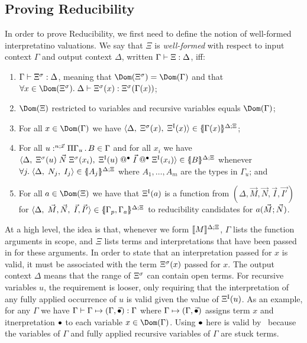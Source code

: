 \documentclass{article}
\begin{document}
\subsection{Proving Reducibility}
\label{subsec:reducibility}

In order to prove Reducibility, we first need to define the notion of
well-formed interpretatino valuations.
We say that $\Xi$ is \emph{well-formed} with respect to input
context $\Gamma$ and output context $\Delta$,
written $\ivtypej{\Xi}{\Delta}$, iff:
\begin{enumerate}
\item $\typej{\Dsubst[\Xi]}{\Delta}$, meaning that
  $\Dom(\Dsubst[\Xi])=\Dom(\Gamma)$ and that
  $\forall x\in\Dom(\Dsubst[\Xi]).\;\typej[\Delta]{\Dsubst[\Xi](x)}{\Dsubst[\Xi](\Gamma(x))}$;

\item $\Dom(\Xi)$ restricted to variables and recursive variables
  equals $\Dom(\Gamma)$;

\item For all $x\in\Dom(\Gamma)$ we have
  $\triple{\Delta}{\Dsubst[\Xi](x)}{\Dlookup{x}}\in\interpd{\Gamma(x)}$;

\item For all $\guform{n}{\vec{x}}{\pigamma{\Gamma_u}{B}}\in\Gamma$ and for all $x_i$ we have
  $\triple{\Delta}{\Dsubst[\Xi](u)\;\vec{N}\;\Dsubst[\Xi](x_i)}{\appstar{\appstar{\Dlookup{u}}{\vec{I}}}{\Dlookup{x_i}}}\in\interpd{B}$
  whenever $\forall j.\;\triple{\Delta}{N_j}{I_j}\in\interpd{A_j}$ where
  $A_1,\ldots,A_m$ are the types in $\Gamma_u$; and

\item For all $a\in\Dom(\Xi)$ we
  have that $\Dlookup{a}$ is a function from
  $(\Delta,\vec{M},\vec{N},\vec{I},\vec{I'})$ for
  $\triple{\Delta}{\vec{M},\vec{N}}{\vec{I},\vec{I'}}\in\interpd{\Gamma_p,\Gamma_a}$
  to reducibility candidates for $\ctorapp{a}{\vec{M}}{\vec{N}}$.
\end{enumerate}
At a high level, the idea is that, whenever we form $\interp{M}$,
$\Gamma$ lists the function arguments in scope, and $\Xi$ lists terms
and interpretations that have been passed in for these arguments.  In
order to state that an interpretation passed for $x$ is valid, it must
be associated with the term $\Dsubst[\Xi](x)$ passed for $x$.  The
output context $\Delta$ means that the range of $\Dsubst[\Xi]$ can
contain open terms. For recursive variables $u$, the requirement is
looser, only requiring that the interpretation of any fully applied
occurrence of $u$ is valid given the value of $\Dlookup{u}$.  As an
example, for any $\Gamma$ we have
$\ivtypej{\dgform[\Gamma]{\Gamma}{\vec{\dummy}}}{\Gamma}$ where
$\dgform[\Gamma]{\Gamma}{\vec{\dummy}}$ assigns term $x$ and
itnerpretation $\dummy$ to each variable $x\in\Dom(\Gamma)$.  Using
$\dummy$ here is valid by \CRfour\ because the variables of $\Gamma$
and fully applied recursive variables of $\Gamma$ are stuck terms.
\end{document}
